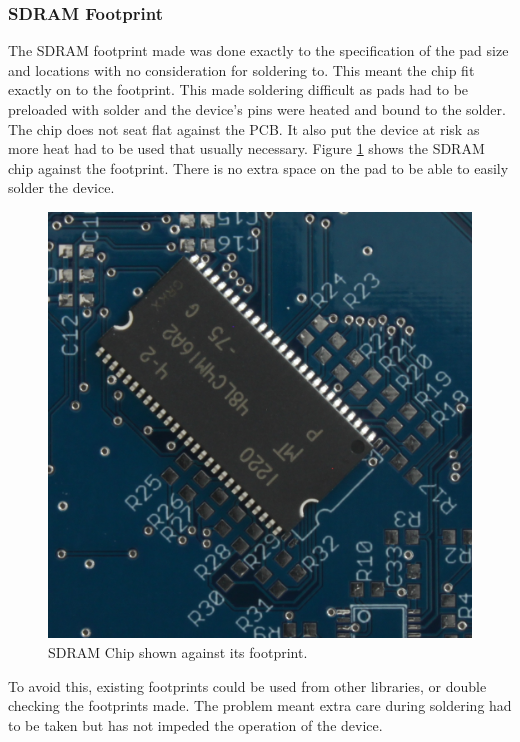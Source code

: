\subsubsection{SDRAM Footprint}
The SDRAM footprint made was done exactly to the specification of the pad size and locations with no consideration for soldering to. This meant the chip fit exactly on to the footprint. This made soldering difficult as pads had to be preloaded with solder and the device's pins were heated and bound to the solder. The chip does not seat flat against the PCB. It also put the device at risk as more heat had to be used that usually necessary. Figure \ref{fig:SDRAM_Err} shows the SDRAM chip against the footprint. There is no extra space on the pad to be able to easily solder the device.

\begin{figure}
\centering
\includegraphics[width=\textwidth / 2]{./Figures/PCB_SDRAM.jpg}
\caption{SDRAM Chip shown against its footprint.}
\label{fig:SDRAM_Err}
\end{figure}

To avoid this, existing footprints could be used from other libraries, or double checking the footprints made. The problem meant extra care during soldering had to be taken but has not impeded the operation of the device. 


